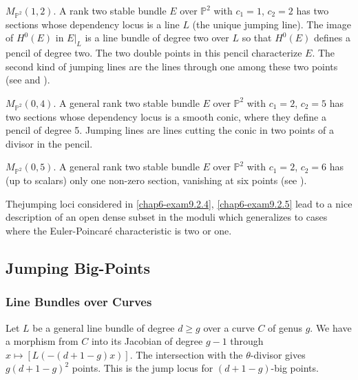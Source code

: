 \begin{subexample}\label{chap6-exam9.2.3}
$M_{\mathbb{P}^{2}}(1,2)$. A rank two stable bundle $E$ over
$\mathbb{P}^{2}$ with $c_{1}=1$, $c_{2}=2$ has two sections whose
dependency locus is a line $L$ (the unique jumping line). The image of
$H^{0}(E)$ in $E|_{L}$ is a line bundle of degree two over $L$ so that
$H^{0}(E)$ defines a pencil of degree two. The two double points in
this pencil characterize $E$. The second kind of jumping lines are the
lines through one among these two points (see \cite[p. 236]{chap6-LP1}
and \cite[p. 256]{chap6-Hu1}).
\end{subexample}

\begin{subexample}\label{chap6-exam9.2.4}
$M_{\mathbb{P}^{2}}(0,4)$. A general rank two stable bundle $E$ over
$\mathbb{P}^{2}$ with $c_{1}=2$, $c_{2}=5$ has two sections whose
dependency locus is a smooth conic, where they define a pencil of
degree 5. Jumping lines are lines cutting the conic in two points of a
divisor in the pencil. 
\end{subexample}

\begin{subexample}\label{chap6-exam9.2.5}
$M_{\mathbb{P}^{2}}(0,5)$. A general rank two stable bundle $E$ over
$\mathbb{P}^{2}$ with $c_{1}=2$, $c_{2}=6$ has (up to scalars) only
one non-zero section, vanishing at six points
(see \cite[p. 84]{chap6-B3}). 
\end{subexample}

\begin{remark*}
The\pageoriginale jumping loci considered
in \ref{chap6-exam9.2.4}, \ref{chap6-exam9.2.5} lead to a nice
description of an open dense subset in the moduli which generalizes to
cases where the Euler-Poincar\'e characteristic is two or one. 
\end{remark*}

\subsection{Jumping Big-Points}\label{chap6-sec9.3}

\subsubsection{Line Bundles over Curves}\label{chap6-sec9.3.1}

Let $L$ be a general line bundle of degree $d\geq g$ over a curve $C$
of genus $g$. We have a morphism from $C$ into its Jacobian of degree
$g-1$ through $x\mapsto [L(-(d+1-g)x)]$. The intersection with the
$\theta$-divisor gives $g(d+1-g)^{2}$ points. This is the jump locus
for $(d+1-g)$-big points. 


